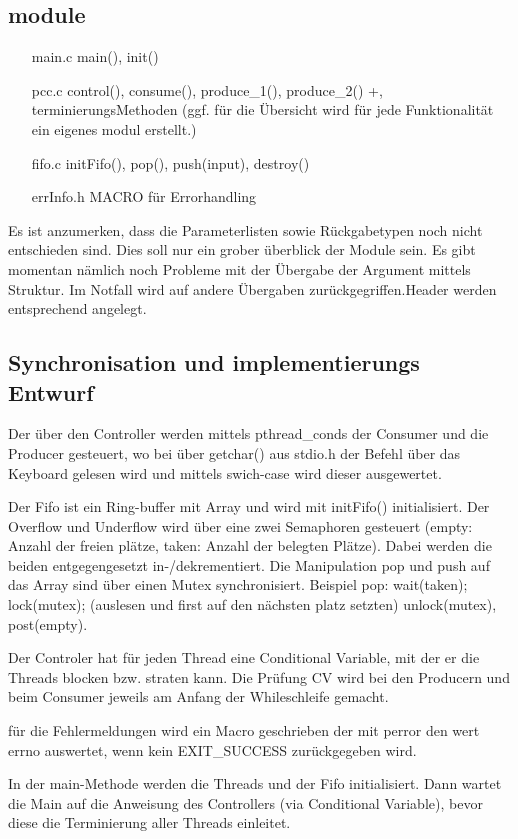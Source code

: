 \documentclass[draft=false
              ,paper=a4
              ,twoside=false
              ,fontsize=11pt
              ,headsepline
              ,BCOR10mm
              ,DIV11
              ]{scrartcl}
\begin{document}
\subsection{module}
  \begin{enumerate}
     \item[main.c] main(), init() 
     \item[pcc.c] control(), consume(), produce\_1(), produce\_2() +,  terminierungsMethoden \newline (ggf. für die Übersicht wird für jede Funktionalität ein eigenes modul erstellt.)
     \item[fifo.c] initFifo(), pop(), push(input), destroy()
     \item[errInfo.h] MACRO für Errorhandling
  \end{enumerate} 
  Es ist anzumerken, dass die Parameterlisten sowie Rückgabetypen noch nicht entschieden sind. Dies soll nur ein grober überblick der Module sein. Es gibt momentan nämlich noch Probleme mit der Übergabe der Argument mittels Struktur. Im Notfall wird auf andere Übergaben zurückgegriffen.Header werden entsprechend angelegt. 
  
  \subsection{Synchronisation und implementierungs Entwurf}
   Der über den Controller werden mittels pthread\_conds der Consumer und die Producer gesteuert, wo bei über getchar() aus stdio.h der Befehl über das Keyboard gelesen wird und mittels swich-case wird dieser ausgewertet. 
   
   Der Fifo ist ein Ring-buffer mit Array und wird mit initFifo() initialisiert. Der Overflow und Underflow wird über eine zwei Semaphoren gesteuert (empty: Anzahl der freien plätze, taken: Anzahl der belegten Plätze). Dabei werden die beiden entgegengesetzt in-/dekrementiert. Die Manipulation pop und push auf das Array sind über einen Mutex synchronisiert. Beispiel pop: wait(taken); lock(mutex); (auslesen und first auf den nächsten platz setzten) unlock(mutex), post(empty).
   
   Der Controler hat für jeden Thread eine Conditional Variable, mit der er die Threads blocken bzw. straten kann. Die Prüfung CV wird bei den Producern und beim Consumer jeweils am Anfang der Whileschleife gemacht.
   
   für die Fehlermeldungen wird ein Macro geschrieben der mit perror den wert errno auswertet, wenn kein EXIT\_SUCCESS zurückgegeben wird.

   In der main-Methode werden die Threads und der Fifo initialisiert. Dann wartet die Main auf die Anweisung des Controllers (via Conditional Variable), bevor diese die Terminierung aller Threads einleitet.   
      
\end{document}
